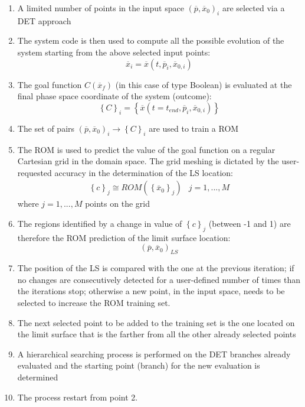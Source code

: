 \begin{enumerate}
\item A limited number of points in the input space $\left ( \overline{p},\overline{x}_{0} \right )_{i}$ are selected via a DET approach
\item The system code is then used to compute all the possible evolution of the system starting from the above selected input points:
\begin{equation}
    \overline{x}_{i}=\overline{x}\left (t,\overline{p}_{i},\overline{x}_{0,i}  \right )
\end{equation}
\item The goal function  $C\left (\overline{x}_{f}\right )$ (in this case of type Boolean) is evaluated at the final phase space coordinate of the system (outcome):
\begin{equation}
 \left \{ C \right \}_{i}=\left \{ \overline{x} \left (  t=t_{end},\overline{p}_{i},\overline{x}_{0,i}\right )\right \}
\end{equation}
\item The set of pairs $\left ( \overline{p},\overline{x}_{0} \right )_{i} \rightarrow \left \{ C \right \}_{i}$ are used to train a ROM
\item The ROM is used to predict the value of the goal function on a regular Cartesian grid  in the domain space. The grid meshing is dictated by the user-requested accuracy in the determination of the LS location:
\begin{equation}
 \begin{matrix}
 \left \{ c \right \}_{j} \cong ROM\left ( \left \{ \overline{x}_{0} \right \}_{j} \right ) & j=1,...,M
\end{matrix}
\end{equation}
where $j=1, ..., M$ points on the grid
\item The regions identified by a change in value of $\left \{ c \right \}_{j}$ (between -1 and 1) are therefore the ROM prediction of the limit surface location:
\begin{equation}
(\overline{p},\overline{x}_{0})_{LS}
\end{equation}
\item The position of the LS is compared with the one at the previous iteration; if no changes are consecutively detected for a user-defined number of times than the iterations stop; otherwise a new point, in the input space, needs to be selected to increase the ROM training set.
\item The next selected point to be added to the training set is the one located on the limit surface that is the farther from all the other already selected points
\item A hierarchical searching process is performed on the DET branches already evaluated and the starting point (branch) for the new evaluation is determined
\item The process restart from point 2.
\end{enumerate}
